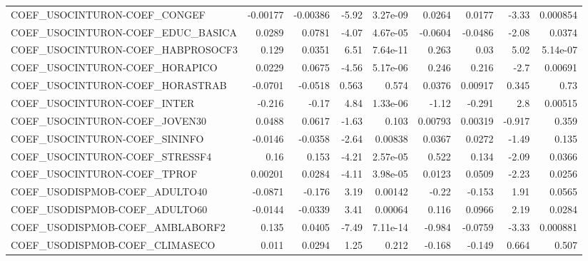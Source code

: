 \begin{tabular}{lrrrrrrrr}
COEF\_USOCINTURON-COEF\_CONGEF           &    -0.00177 &     -0.00386 &    -5.92 & 3.27e-09 &     0.0264 &      0.0177 &        -3.33 &      0.000854 \\
COEF\_USOCINTURON-COEF\_EDUC\_BASICA      &      0.0289 &       0.0781 &    -4.07 & 4.67e-05 &    -0.0604 &     -0.0486 &        -2.08 &        0.0374 \\
COEF\_USOCINTURON-COEF\_HABPROSOCF3      &       0.129 &       0.0351 &     6.51 & 7.64e-11 &      0.263 &        0.03 &         5.02 &      5.14e-07 \\
COEF\_USOCINTURON-COEF\_HORAPICO         &      0.0229 &       0.0675 &    -4.56 & 5.17e-06 &      0.246 &       0.216 &         -2.7 &       0.00691 \\
COEF\_USOCINTURON-COEF\_HORASTRAB        &     -0.0701 &      -0.0518 &    0.563 &    0.574 &     0.0376 &     0.00917 &        0.345 &          0.73 \\
COEF\_USOCINTURON-COEF\_INTER            &      -0.216 &        -0.17 &     4.84 & 1.33e-06 &      -1.12 &      -0.291 &          2.8 &       0.00515 \\
COEF\_USOCINTURON-COEF\_JOVEN30          &      0.0488 &       0.0617 &    -1.63 &    0.103 &    0.00793 &     0.00319 &       -0.917 &         0.359 \\
COEF\_USOCINTURON-COEF\_SININFO          &     -0.0146 &      -0.0358 &    -2.64 &  0.00838 &     0.0367 &      0.0272 &        -1.49 &         0.135 \\
COEF\_USOCINTURON-COEF\_STRESSF4         &        0.16 &        0.153 &    -4.21 & 2.57e-05 &      0.522 &       0.134 &        -2.09 &        0.0366 \\
COEF\_USOCINTURON-COEF\_TPROF            &     0.00201 &       0.0284 &    -4.11 & 3.98e-05 &     0.0123 &      0.0509 &        -2.23 &        0.0256 \\
COEF\_USODISPMOB-COEF\_ADULTO40          &     -0.0871 &       -0.176 &     3.19 &  0.00142 &      -0.22 &      -0.153 &         1.91 &        0.0565 \\
COEF\_USODISPMOB-COEF\_ADULTO60          &     -0.0144 &      -0.0339 &     3.41 &  0.00064 &      0.116 &      0.0966 &         2.19 &        0.0284 \\
COEF\_USODISPMOB-COEF\_AMBLABORF2        &       0.135 &       0.0405 &    -7.49 & 7.11e-14 &     -0.984 &     -0.0759 &        -3.33 &      0.000881 \\
COEF\_USODISPMOB-COEF\_CLIMASECO         &       0.011 &       0.0294 &     1.25 &    0.212 &     -0.168 &      -0.149 &        0.664 &         0.507 \\

\end{tabular}
